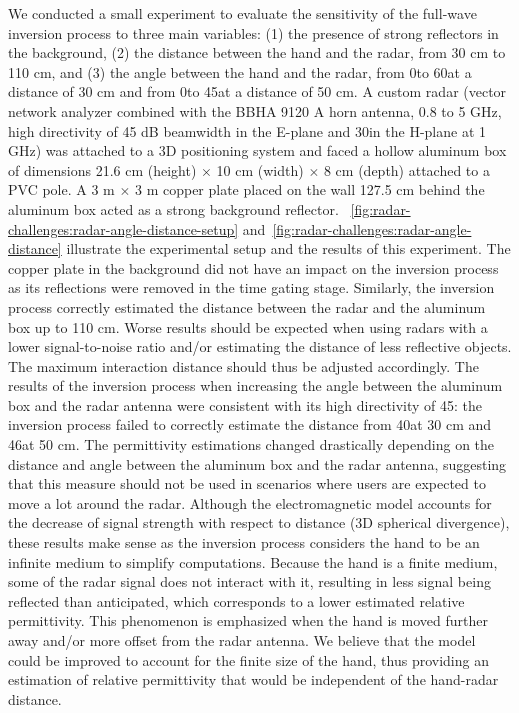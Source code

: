 We conducted a small experiment to evaluate the sensitivity of the full-wave inversion process to three main variables: (1) the presence of strong reflectors in the background, (2) the distance between the hand and the radar, from 30 cm to 110 cm, and (3) the angle between the hand and the radar, from 0\textdegree to 60\textdegree at a distance of 30 cm and from 0\textdegree to 45\textdegree at a distance of 50 cm. 
%
A custom radar (vector network analyzer combined with the BBHA 9120 A horn antenna, 0.8 to 5 GHz, high directivity of 45 dB beamwidth in the E-plane and 30\textdegree in the H-plane at 1 GHz) was attached to a 3D positioning system and faced a hollow aluminum box of dimensions 21.6 cm (height) $\times$ 10 cm (width) $\times$ 8 cm (depth) attached to a PVC pole. A 3 m $\times$ 3 m copper plate placed on the wall 127.5 cm behind the aluminum box acted as a strong background reflector. \fig~\ref{fig:radar-challenges:radar-angle-distance-setup} and~\ref{fig:radar-challenges:radar-angle-distance} illustrate the experimental setup and the results of this experiment. 
%
The copper plate in the background did not have an impact on the inversion process as its reflections were removed in the time gating stage.
%
Similarly, the inversion process correctly estimated the distance between the radar and the aluminum box up to 110 cm. Worse results should be expected when using radars with a lower signal-to-noise ratio and/or estimating the distance of less reflective objects. The maximum interaction distance should thus be adjusted accordingly.
%
The results of the inversion process when increasing the angle between the aluminum box and the radar antenna were consistent with its high directivity of 45\textdegree: the inversion process failed to correctly estimate the distance from 40\textdegree at 30 cm and 46\textdegree at 50 cm.
%
The permittivity estimations changed drastically depending on the distance and angle between the aluminum box and the radar antenna, suggesting that this measure should not be used in scenarios where users are expected to move a lot around the radar. 
Although the electromagnetic model accounts for the decrease of signal strength with respect to distance (3D spherical divergence), these results make sense as the inversion process considers the hand to be an infinite medium to simplify computations. Because the hand is a finite medium, some of the radar signal does not interact with it, resulting in less signal being reflected than anticipated, which corresponds to a lower estimated relative permittivity. This phenomenon is emphasized when the hand is moved further away and/or more offset from the radar antenna. 
%
We believe that the model could be improved to account for the finite size of the hand, thus providing an estimation of relative permittivity that would be independent of the hand-radar distance.

